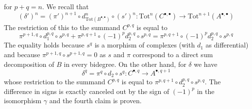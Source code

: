 \begin{remark}
for $p + q = n$. We recall that
$$
(\delta')^n =
(\pi')^{n + 1} \circ d_{\text{Tot}(B^{\bullet, \bullet})}^n \circ (s')^n :
\text{Tot}^n(C^{\bullet, \bullet}) \to
\text{Tot}^{n + 1}(A^{\bullet, \bullet})
$$
The restriction of this to the summand $C^{p, q}$ is equal to
$$
\pi^{p + 1, q} \circ
d_1^{p, q} \circ
s^{p, q} +
\pi^{p, q + 1} \circ
(-1)^p d_2^{p, q} \circ
s^{p, q} =
\pi^{p, q + 1} \circ
(-1)^p d_2^{p, q} \circ
s^{p, q}
$$
The equality holds because $s^q$ is a morphism of complexes (with $d_1$
as differential) and because $\pi^{p + 1, q} \circ s^{p + 1, q} = 0$
as $s$ and $\pi$ correspond to a direct sum decomposition of $B$
in every bidegree. On the other hand, for $\delta$ we have
$$
\delta^q =  \pi^q \circ d_2 \circ s^q :
C^{\bullet, q} \to A^{\bullet, q + 1}
$$
whose restriction to the summand $C^{p, q}$ is equal to
$\pi^{p, q + 1} \circ d_2^{p, q} \circ s^{p, q}$.
The difference in signs is exactly canceled out by the sign
of $(-1)^p$ in the isomorphism $\gamma$ and the fourth claim is proven.
\end{remark}

